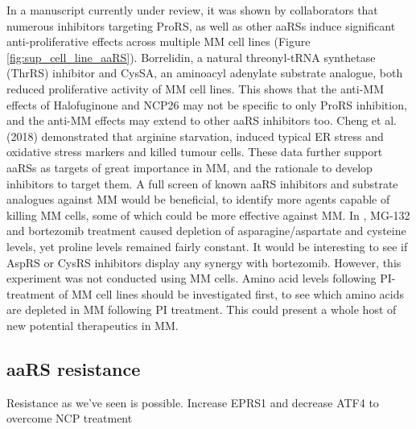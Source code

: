 In a manuscript currently under review, it was shown by collaborators that numerous inhibitors targeting ProRS, as well as other aaRSs induce significant anti-proliferative effects across multiple MM cell lines (Figure \ref{fig:sup_cell_line_aaRS})\cite{bottpreclinical2022}.
Borrelidin, a natural threonyl-tRNA synthetase (ThrRS) inhibitor and CysSA, an aminoacyl adenylate substrate analogue, both reduced proliferative activity of MM cell lines.
This shows that the anti-MM effects of Halofuginone and NCP26 may not be specific to only ProRS inhibition, and the anti-MM effects may extend to other aaRS inhibitors too.
Cheng et al. (2018) demonstrated that arginine starvation, induced typical ER stress and oxidative stress markers and killed tumour cells\cite{cheng2018arginine}.
These data further support aaRSs as targets of great importance in MM, and the rationale to develop inhibitors to target them.
A full screen of known aaRS inhibitors and substrate analogues against MM would be beneficial, to identify more agents capable of killing MM cells, some of which could be more effective against MM\@.
In \cite{suraweera2012failure}, MG-132 and bortezomib treatment caused depletion of asparagine/aspartate and cysteine levels, yet proline levels remained fairly constant.
It would be interesting to see if AspRS or CysRS inhibitors display any synergy with bortezomib.
However, this experiment was not conducted using MM cells.
Amino acid levels following PI-treatment of MM cell lines should be investigated first, to see which amino acids are depleted in MM following PI treatment.
This could present a whole host of new potential therapeutics in MM\@.

\subsection{aaRS resistance}
Resistance as we've seen is possible. Increase EPRS1 and decrease ATF4 to overcome NCP treatment



